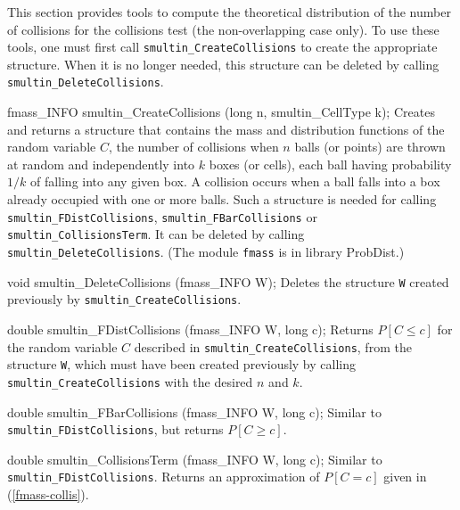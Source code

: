 \fi  %

\ifdetailed  %


This section provides tools to compute the theoretical distribution
of the number of collisions for the collisions test (the non-overlapping
case only).
To use these tools, one must first call {\tt smultin\_CreateCollisions} 
to create the appropriate structure.  When it is no longer needed, 
this structure can be deleted by 
calling {\tt smultin\_DeleteCollisions}.

\code


fmass_INFO smultin_CreateCollisions (long n, smultin_CellType k);
\endcode
 \tab Creates and returns a structure that contains the mass and
   distribution functions of the random variable $C$, 
   the number of collisions when $n$ balls (or points)
   are thrown at random and independently into $k$ boxes (or cells), each
   ball having probability $1/k$ of falling into any given box.
   A collision occurs when a ball falls into a box already occupied 
   with one or more balls. 
   Such a structure is needed for calling 
   {\tt smultin\_FDistCollisions}, {\tt smultin\_FBarCollisions} or
   {\tt smultin\_CollisionsTerm}. It can be deleted by calling
   {\tt smultin\_DeleteCollisions}.
  (The module {\tt fmass} is in library ProbDist.)

 \endtab
\code


void smultin_DeleteCollisions (fmass_INFO W);
\endcode
  \tab Deletes the structure {\tt W} created previously 
   by {\tt smultin\_CreateCollisions}.
 \endtab
\code


double smultin_FDistCollisions (fmass_INFO W, long c);
\endcode
 \tab Returns $P[C\le c]$ for the random variable $C$
  described in {\tt smultin\_CreateCollisions}, from the structure 
  {\tt W}, which must have been created previously by calling 
  {\tt smultin\_CreateCollisions} with the desired $n$ and $k$.
 \endtab
\code


double smultin_FBarCollisions (fmass_INFO W, long c);
\endcode
 \tab  Similar to {\tt smultin\_FDistCollisions}, but returns $P[C\ge c]$.
\endtab
\code


double smultin_CollisionsTerm (fmass_INFO W, long c);
\endcode
 \tab  Similar to {\tt smultin\_FDistCollisions}. Returns an
   approximation of $P[C = c]$ given in (\ref{fmass-collis}).
 \endtab

\fi



